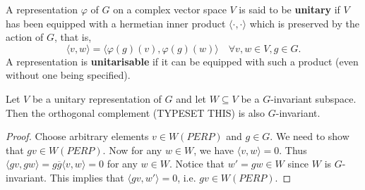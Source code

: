 \begin{defn}
A representation $\varphi$ of $G$ on a complex vector space $V$ is said to be \textbf{unitary} if $V$ has been equipped with a hermetian inner product $\langle \cdot{,}\cdot \rangle$ which is preserved by the action of $G$, that is, 
\[ \langle v , w \rangle = \langle \varphi(g)(v) , \varphi(g)(w) \rangle \quad \forall v,w \in V, g \in G. \]
A representation is \textbf{unitarisable} if it can be equipped with such a product (even without one being specified).
\end{defn}

\begin{lemma}
Let $V$ be a unitary representation of $G$ and let $W \subseteq V$ be a $G$-invariant subspace.  Then the orthogonal complement (TYPESET THIS) is also $G$-invariant.
\end{lemma}
\begin{proof}
Choose arbitrary elements $v \in W (PERP)$ and $g \in G$.  We need to show that $gv \in W(PERP)$.  Now for any $w \in W$, we have $\langle v,w \rangle = 0$.  Thus $\langle gv, gw \rangle = g \overline{g} \langle v , w \rangle = 0$ for any $w \in W$.  Notice that $w' = gw \in W$ since $W$ is $G$-invariant.  This implies that $ \langle gv, w' \rangle =0$, i.e. $gv \in W(PERP)$.
\end{proof}




